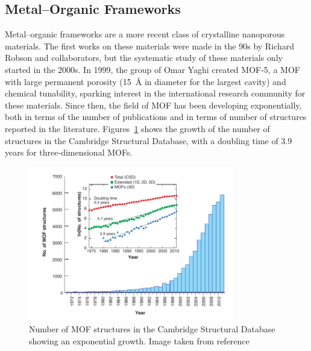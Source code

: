\documentclass[thesis]{subfiles}
\begin{document}
\newpage
\subsection{Metal--Organic Frameworks}

Metal--organic frameworks are a more recent class of crystalline nanoporous
materials. The first works on these materials were made in the 90s by Richard
Robson and collaborators\cite{Abrahams1991, Robson2008}, but the systematic
study of these materials only started in the 2000s. In 1999, the group of Omar
Yaghi created MOF-5\cite{Li1999}, a MOF with large permanent porosity
(\SI{15}{\AA} in diameter for the largest cavity) and chemical tunability,
sparking interest in the international research community for these materials.
Since then, the field of MOF has been developing exponentially, both in terms of
the number of publications and in terms of number of structures reported in the
literature. Figures~\ref{fig:number-of-mofs} shows the growth of the number of
structures in the Cambridge Structural Database, with a doubling time of 3.9
years for three-dimensional MOFs.

\begin{figure}[ht]
    \centering
    \includegraphics[width=0.8\textwidth]{figures/cited/number-of-mofs}
    \caption{Number of MOF structures in the Cambridge Structural Database
    showing an exponential growth. Image taken from reference~\cite{Furukawa2013}}
    \label{fig:number-of-mofs}
\end{figure}
\end{document}
